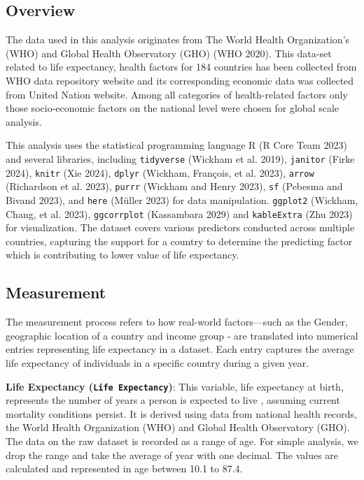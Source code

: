 \documentclass[
  letterpaper,
  DIV=11,
  numbers=noendperiod]{scrartcl}
\begin{document}
\subsection{Overview}\label{overview}

The data used in this analysis originates from The World Health
Organization's (WHO) and Global Health Observatory (GHO) (WHO 2020).
This data-set related to life expectancy, health factors for 184
countries has been collected from WHO data repository website and its
corresponding economic data was collected from United Nation website.
Among all categories of health-related factors only those socio-economic
factors on the national level were chosen for global scale analysis.

This analysis uses the statistical programming language R (R Core Team
2023) and several libraries, including \texttt{tidyverse} (Wickham et
al. 2019), \texttt{janitor} (Firke 2024), \texttt{knitr} (Xie 2024),
\texttt{dplyr} (Wickham, François, et al. 2023), \texttt{arrow}
(Richardson et al. 2023), \texttt{purrr} (Wickham and Henry 2023),
\texttt{sf} (Pebesma and Bivand 2023), and \texttt{here} (Müller 2023)
for data manipulation. \texttt{ggplot2} (Wickham, Chang, et al. 2023),
\texttt{ggcorrplot} (Kassambara 2029) and \texttt{kableExtra} (Zhu 2023)
for visualization. The dataset covers various predictors conducted
across multiple countries, capturing the support for a country to
determine the predicting factor which is contributing to lower value of
life expectancy.

\subsection{Measurement}\label{measurement}

The measurement process refers to how real-world factors---such as the
Gender, geographic location of a country and income group - are
translated into numerical entries representing life expectancy in a
dataset. Each entry captures the average life expectancy of individuals
in a specific country during a given year.

\textbf{Life Expectancy (\texttt{Life\ Expectancy})}: This variable,
life expectancy at birth, represents the number of years a person is
expected to live , assuming current mortality conditions persist. It is
derived using data from national health records, the World Health
Organization (WHO) and Global Health Observatory (GHO). The data on the
raw dataset is recorded as a range of age. For simple analysis, we drop
the range and take the average of year with one decimal. The values are
calculated and represented in age between 10.1 to 87.4.
\end{document}
